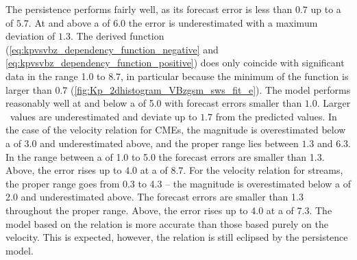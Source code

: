 The persistence performs fairly well, as its forecast error is less than $0.7$ up to a \Kp{} of $5.7$. At and above a \Kp{} of $6.0$ the error is underestimated with a maximum deviation of $1.3$.
The derived \vBz{} function (\ref{eq:kpvsvbz_dependency_function_negative} and \ref{eq:kpvsvbz_dependency_function_positive}) does only coincide with significant data in the \Kp{} range 1.0 to 8.7, in particular because the minimum of the \vBz{} function is larger than 0.7 (\autoref{fig:Kp_2dhistogram_VBzgsm_sws_fit_e}). The model performs reasonably well at and below a \Kp{} of 5.0 with forecast errors smaller than $1.0$. Larger \Kp~values are underestimated and deviate up to $1.7$ from the predicted values.
In the case of the velocity relation for CMEs, the \Kp{} magnitude is overestimated below a \Kp{} of 3.0 and underestimated above, and the proper range lies between $1.3$ and $6.3$. In the range between a \Kp{} of 1.0 to 5.0 the forecast errors are smaller than 1.3. Above, the error rises up to $4.0$ at a \Kp{} of $8.7$.
For the velocity relation for streams, the proper range goes from 0.3 to 4.3 -- the magnitude is overestimated below a \Kp{} of 2.0 and underestimated above. The forecast errors are smaller than 1.3 throughout the proper range. Above, the error rises up to 4.0 at a \Kp{} of 7.3.
The model based on the \vBz{} relation is more accurate than those based purely on the velocity. This is expected, however, the \vBz{} relation is still eclipsed by the persistence model.

\pagebreak

